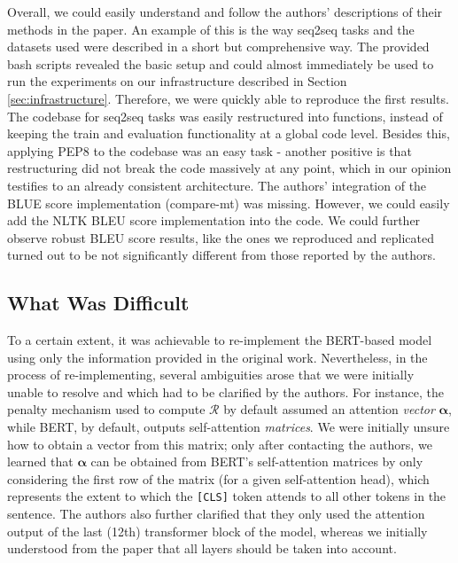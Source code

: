 Overall, we could easily understand and follow the authors' descriptions of their methods in the paper. An example of this is the way seq2seq tasks and the datasets used were described in a short but comprehensive way. The provided bash scripts revealed the basic setup and could almost immediately be used to run the experiments on our infrastructure described in Section \ref{sec:infrastructure}. Therefore, we were quickly able to reproduce the first results. The codebase for seq2seq tasks was easily restructured into functions, instead of keeping the train and evaluation functionality at a global code level. Besides this, applying PEP8 to the codebase was an easy task - another positive is that restructuring did not break the code massively at any point, which in our opinion testifies to an already consistent architecture.
The authors' integration of the BLUE score implementation (compare-mt) was missing. However, we could easily add the NLTK BLEU score implementation into the code. We could further observe robust BLEU score results, like the ones we reproduced and replicated turned out to be not significantly different from those reported by the authors.

\subsection{What Was Difficult}

To a certain extent, it was achievable to re-implement the BERT-based model using only the information provided in the original work. Nevertheless, in the process of re-implementing, several ambiguities arose that we were initially unable to resolve and which had to be clarified by the authors. For instance, the penalty mechanism used to compute $\mathcal{R}$ by default assumed an attention \textit{vector} $\boldsymbol{\alpha}$, while BERT, by default, outputs self-attention \textit{matrices}. We were initially unsure how to obtain a vector from this matrix; only after contacting the authors, we learned that $\boldsymbol{\alpha}$ can be obtained from BERT's self-attention matrices by only considering the first row of the matrix (for a given self-attention head), which represents the extent to which the \texttt{[CLS]} token attends to all other tokens in the sentence. The authors also further clarified that they only used the attention output of the last (12th) transformer block of the model, whereas we initially understood from the paper that all layers should be taken into account.

